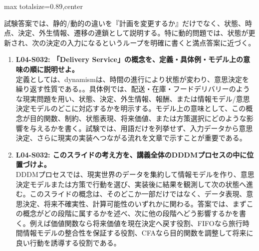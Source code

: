 \begin{minipage}[t]{0.58\textwidth}
\begin{adjustbox}{max totalsize={\textwidth}{0.89\textheight},center}
\begin{minipage}{\textwidth}
試験答案では、静的/動的の違いを『計画を変更するか』だけでなく、状態、時点、決定、外生情報、遷移の連鎖として説明する。特に動的問題では、状態が更新され、次の決定の入力になるというループを明確に書くと満点答案に近づく。\par{}\begin{enumerate}\item \textbf{L04-S032: 「Delivery Service」の概念を、定義・具体例・モデル上の意味の順に説明せよ。}\\定義としては、dynamismは、時間の進行により状態が変わり、意思決定を繰り返す性質である。。具体例では、配送・在庫・フードデリバリーのような現実問題を用い、状態、決定、外生情報、報酬、または情報モデル/意思決定モデルのどこに対応するかを明示する。モデル上の意味として、この概念が目的関数、制約、状態表現、将来価値、または方策選択にどのような影響を与えるかを書く。試験では、用語だけを列挙せず、入力データから意思決定、さらに現実の実装へつながる流れを文章で示すことが重要である。\item \textbf{L04-S032: このスライドの考え方を、講義全体のDDDMプロセスの中に位置づけよ。}\\DDDMプロセスでは、現実世界のデータを集約して情報モデルを作り、意思決定モデルまたは方策で行動を選び、実装後に結果を観測して次の状態へ進む。このスライドの概念は、そのどこか一部だけではなく、データ表現、意思決定、将来不確実性、計算可能性のいずれかに関わる。答案では、まずこの概念がどの段階に属するかを述べ、次に他の段階へどう影響するかを書く。例えば価値関数なら将来価値を現在決定へ戻す役割、FIFOなら旅行時間情報モデルの整合性を保証する役割、CFAなら目的関数を調整して将来に良い行動を誘導する役割である。\end{enumerate}
\end{minipage}
\end{adjustbox}
\end{minipage}


